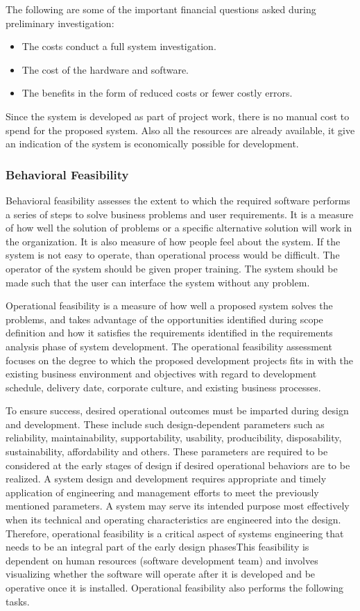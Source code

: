 The following are some of the important financial questions asked during preliminary investigation:
\begin{itemize}
	\item The costs conduct a full system investigation.
	\item The cost of the hardware and software.
	\item The benefits in the form of reduced costs or fewer costly errors.
\end{itemize}

Since the system is developed as part of project work, there is no manual cost to spend for the proposed system. Also all the resources are already available, it give an indication of the system is economically possible for development.

\subsubsection{Behavioral Feasibility}
Behavioral feasibility assesses the extent to which the required software performs a series of steps to solve business problems and user requirements. It is a measure of how well the solution of problems or a specific alternative solution will work in the organization. It is also measure of how people feel about the system. If the system is not easy to operate, than operational process would be difficult. The operator of the system should be given proper training. The system should be made such that the user can interface the system without any problem.

Operational feasibility is a measure of how well a proposed system solves the problems, and takes advantage of the opportunities identified during scope definition and how it satisfies the requirements identified in the requirements analysis phase of system development. The operational feasibility assessment focuses on the degree to which the proposed development projects fits in with the existing business environment and objectives with regard to development schedule, delivery date, corporate culture, and existing business processes.

To ensure success, desired operational outcomes must be imparted during design and development. These include such design-dependent parameters such as reliability, maintainability, supportability, usability, producibility, disposability, sustainability, affordability and others. These parameters are required to be considered at the early stages of design if desired operational behaviors are to be realized. A system design and development requires appropriate and timely application of engineering and management efforts to meet the previously mentioned parameters. A system may serve its intended purpose most effectively when its technical and operating characteristics are engineered into the design. Therefore, operational feasibility is a critical aspect of systems engineering that needs to be an integral part of the early design phasesThis feasibility is dependent on human resources (software development team) and involves visualizing whether the software will operate after it is developed and be operative once it is installed. Operational feasibility also performs the following tasks.

